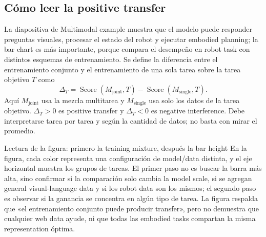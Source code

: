 
\subsection{Cómo leer la positive transfer}

La diapositiva de Multimodal example muestra que el modelo puede responder preguntas visuales, procesar el estado del robot y ejecutar embodied planning; la bar chart es más importante, porque compara el desempeño en robot task con distintos esquemas de entrenamiento. Se define la diferencia entre el entrenamiento conjunto y el entrenamiento de una sola tarea sobre la tarea objetivo $T$ como
$$
\Delta_T=\operatorname{Score}(M_{\text{joint}},T)-\operatorname{Score}(M_{\text{single}},T).
$$
Aquí $M_{\text{joint}}$ usa la mezcla multitarea y $M_{\text{single}}$ usa solo los datos de la tarea objetivo. $\Delta_T>0$ es positive transfer y $\Delta_T<0$ es negative interference. Debe interpretarse tarea por tarea y según la cantidad de datos; no basta con mirar el promedio.



\begin{knowledgebox}{Lectura de la figura: primero la training mixture, después la bar height}
En la figura, cada color representa una configuración de model/data distinta, y el eje horizontal muestra los grupos de tareas. El primer paso no es buscar la barra más alta, sino confirmar si la comparación solo cambia la model scale, si se agregan general visual-language data y si los robot data son los mismos; el segundo paso es observar si la ganancia se concentra en algún tipo de tarea. La figura respalda que «el entrenamiento conjunto puede producir transfer», pero no demuestra que cualquier web data ayude, ni que todas las embodied tasks compartan la misma representation óptima.
\end{knowledgebox}


